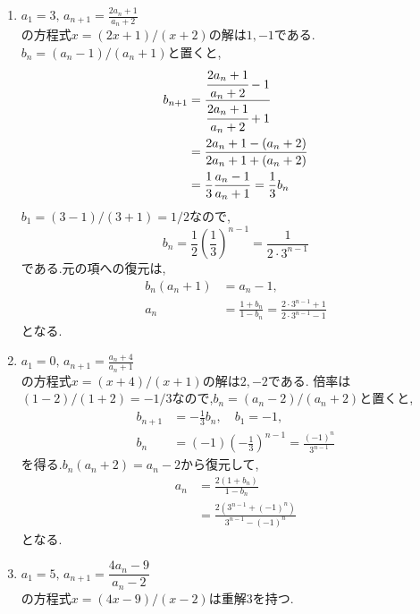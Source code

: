     \noindent{}\par\nobreak
    \begin{enumerate}[label=(\arabic*),parsep=3pt,format=\bookitemlink{example-mobius-1}{solution}{problem}]
      \item $\displaystyle a_1=3,\, a_{n+1}=\frac{2a_n+1}{a_n+2}$\\
            の方程式$x=(2x+1)/(x+2)$の解は$1,-1$である.
            $b_n=(a_n-1)/(a_n+1)$と置くと,
            \begin{align*}
              b_{n+1}&=\cfrac{\cfrac{2a_n+1}{a_n+2}-1}{\cfrac{2a_n+1}{a_n+2}+1}\\
              &=\frac{2a_n+1-(a_n+2)}{2a_n+1+(a_n+2)}\\
              &=\frac13\frac{a_n-1}{a_n+1}=\frac13b_n
            \end{align*}
            $b_1=(3-1)/(3+1)=1/2$なので,
            \[
              b_n=\frac12\left(\frac13\right)^{n-1}
                =\frac1{2\cdot3^{n-1}}
            \]
            である.元の項への復元は,
            \begin{align*}
              b_n(a_n+1)&=a_n-1,\\
              a_n&=\frac{1+b_n}{1-b_n}
                =\frac{2\cdot3^{n-1}+1}{2\cdot3^{n-1}-1}
            \end{align*}
            となる.
      \item $\displaystyle a_1=0,\, a_{n+1}=\frac{a_n+4}{a_n+1}$\\
            の方程式$x=(x+4)/(x+1)$の解は$2,-2$である.
            倍率は$(1-2)/(1+2)=-1/3$なので,$b_n=(a_n-2)/(a_n+2)$と置くと,
            \begin{align*}
              b_{n+1}&=-\frac13b_n,\quad b_1=-1,\\
              b_n&=(-1)\left(-\frac13\right)^{n-1}
                =\frac{(-1)^n}{3^{n-1}}
            \end{align*}
            を得る.$b_n(a_n+2)=a_n-2$から復元して,
            \begin{align*}
              a_n&=\frac{2(1+b_n)}{1-b_n}\\
              &=\frac{2\left(3^{n-1}+(-1)^n\right)}{3^{n-1}-(-1)^n}
            \end{align*}
            となる.
      \item $\displaystyle a_1=5,\, a_{n+1}=\dfrac{4a_n-9}{a_n-2}$\\
            の方程式$x=(4x-9)/(x-2)$は重解$3$を持つ.

\end{enumerate}
